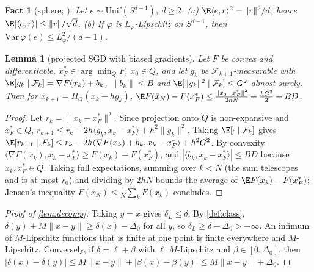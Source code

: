 \documentclass{article} %
\newcommand{\cF}{\mathcal{F}}
\newcommand{\Prj}{\Pi_Q}
\newcommand{\unif}{\mathrm{Unif}}
\newcommand{\ip}[2]{\langle #1,#2\rangle}
\newcommand{\norm}[1]{\lVert #1\rVert}
\theoremstyle{plain}
\newtheorem{lemma}{Lemma}
\newtheorem{fact}{Fact}
\theoremstyle{definition}
\theoremstyle{remark}
\begin{document}
\begin{fact}[sphere; \citealp{ledoux2001concentration}]\label{fact:sphere}
Let $e\sim\unif(S^{d-1})$, $d\ge2$. (a) $\E\ip er^2=\norm r^2/d$, hence $\E|\ip er|\le\norm r/\sqrt d$. (b) If $\varphi$ is $L_\varphi$-Lipschitz on $S^{d-1}$, then $\mathrm{Var}\,\varphi(e)\le L_\varphi^2/(d-1)$.
\end{fact}

\begin{lemma}[projected SGD with biased gradients]\label{lem:sgd}
Let $F$ be convex and differentiable, $x_F^*\in\arg\min_QF$, $x_0\in Q$, and let $g_k$ be $\cF_{k+1}$-measurable with $\E[g_k\mid\cF_k]=\nabla F(x_k)+b_k$, $\norm{b_k}\le B$ and $\E[\norm{g_k}^2\mid\cF_k]\le G^2$ almost surely. Then for $x_{k+1}=\Prj(x_k-hg_k)$,
$\E F(\bar x_N)-F(x_F^*)\le\frac{\norm{x_0-x_F^*}^2}{2hN}+\frac{hG^2}2+BD$.
\end{lemma}
\begin{proof}
Let $r_k=\norm{x_k-x_F^*}^2$. Since projection onto $Q$ is non-expansive and $x_F^*\in Q$, $r_{k+1}\le r_k-2h\ip{g_k}{x_k-x_F^*}+h^2\norm{g_k}^2$. Taking $\E[\cdot\mid\cF_k]$ gives $\E[r_{k+1}\mid\cF_k]\le r_k-2h\ip{\nabla F(x_k)+b_k}{x_k-x_F^*}+h^2G^2$. By convexity $\ip{\nabla F(x_k)}{x_k-x_F^*}\ge F(x_k)-F(x_F^*)$, and $|\ip{b_k}{x_k-x_F^*}|\le BD$ because $x_k,x_F^*\in Q$. Taking full expectations, summing over $k<N$ (the sum telescopes and is at most $r_0$) and dividing by $2hN$ bounds the average of $\E F(x_k)-F(x_F^*)$; Jensen's inequality $F(\bar x_N)\le\frac1N\sum_kF(x_k)$ concludes.
\end{proof}

\begin{proof}[Proof of \cref{lem:decomp}]
Taking $y=x$ gives $\delta_L\le\delta$. By \cref{def:class}, $\delta(y)+M\norm{x-y}\ge\delta(x)-\Delta_0$ for all $y$, so $\delta_L\ge\delta-\Delta_0>-\infty$. An infimum of $M$-Lipschitz functions that is finite at one point is finite everywhere and $M$-Lipschitz. Conversely, if $\delta=\ell+\beta$ with $\ell$ $M$-Lipschitz and $\beta\in[0,\Delta_0]$, then $|\delta(x)-\delta(y)|\le M\norm{x-y}+|\beta(x)-\beta(y)|\le M\norm{x-y}+\Delta_0$.
\end{proof}
\end{document}
